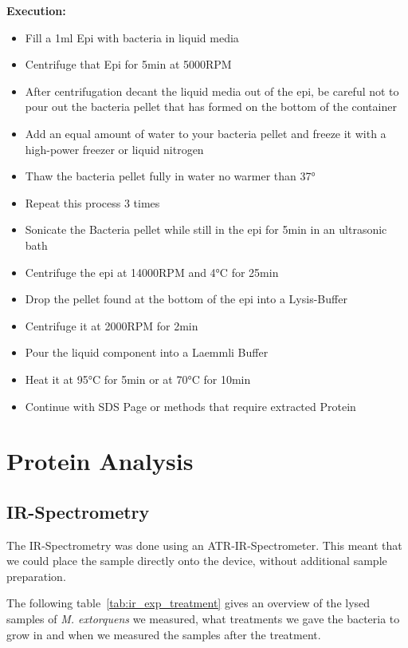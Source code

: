 \textbf{Execution:}

\begin{itemize}
    \item Fill a 1ml Epi with bacteria in liquid media
    \item Centrifuge that Epi for 5min at 5000RPM
    \item After centrifugation decant the liquid media out of the epi, be careful not to pour out the
    bacteria pellet that has formed on the bottom of the container
    \item Add an equal amount of water to your bacteria pellet and freeze it with a high-power freezer
    or liquid nitrogen
    \item Thaw the bacteria pellet fully in water no warmer than 37°
    \item Repeat this process 3 times
    \item Sonicate the Bacteria pellet while still in the epi for 5min in an ultrasonic bath
    \item Centrifuge the epi at 14000RPM and 4°C for 25min
    \item Drop the pellet found at the bottom of the epi into a Lysis-Buffer
    \item Centrifuge it at 2000RPM for 2min
    \item Pour the liquid component into a Laemmli Buffer
    \item Heat it at 95°C for 5min or at 70°C for 10min
    \item Continue with SDS Page or methods that require extracted Protein
\end{itemize}


\section{Protein Analysis\authorA}

\subsection{IR-Spectrometry}

The IR-Spectrometry was done using an ATR-IR-Spectrometer.
This meant that we could place the sample directly onto the device, without additional sample preparation.

The following table~\ref{tab:ir_exp_treatment} gives an overview of the lysed samples of \emph{M. extorquens} we measured, what treatments we gave the bacteria to grow in and when we measured the samples after the treatment.

